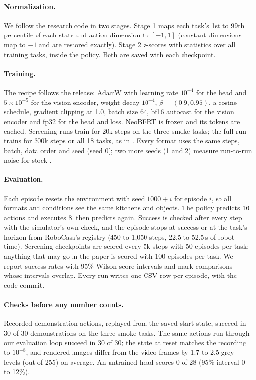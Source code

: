 \paragraph{Normalization.} We follow the \dem{} research code in two stages.
Stage 1 maps each task's 1st to 99th percentile of each state and action
dimension to $[-1,1]$ (constant dimensions map to $-1$ and are restored
exactly). Stage 2 z-scores with statistics over all training tasks, inside
the policy. Both are saved with each checkpoint.

\paragraph{Training.} The recipe follows the \dem{} release: AdamW with
learning rate $10^{-4}$ for the head and $5\times10^{-5}$ for the vision
encoder, weight decay $10^{-4}$, $\beta=(0.9, 0.95)$, a cosine schedule,
gradient clipping at 1.0, batch size 64, bf16 autocast for the vision encoder
and fp32 for the head and loss. NeoBERT is frozen and its tokens are cached.
Screening runs train for 20k steps on the three smoke tasks; the full run
trains for 300k steps on all 18 tasks, as in \dem{}. Every format uses the
same steps, batch, data order and seed (seed 0); two more seeds (1 and 2)
measure run-to-run noise for stock \dem{}.

\paragraph{Evaluation.} Each episode resets the environment with seed
$1000+i$ for episode $i$, so all formats and conditions see the same kitchens
and objects. The policy predicts 16 actions and executes 8, then predicts
again. Success is checked after every step with the simulator's own check,
and the episode stops at success or at the task's horizon from RoboCasa's
registry (450 to 1,050 steps, 22.5 to 52.5\,s of robot time). Screening
checkpoints are scored every 5k steps with 50 episodes per task; anything
that may go in the paper is scored with 100 episodes per task. We report
success rates with 95\% Wilson score intervals and mark comparisons whose
intervals overlap. Every run writes one CSV row per episode, with the code
commit.

\paragraph{Checks before any number counts.} Recorded demonstration actions,
replayed from the saved start state, succeed in 30 of 30 demonstrations on
the three smoke tasks. The same actions run through our evaluation loop
succeed in 30 of 30; the state at reset matches the recording to $10^{-8}$,
and rendered images differ from the video frames by 1.7 to 2.5 grey levels
(out of 255) on average. An untrained head scores 0 of 28 (95\% interval 0 to
12\%).

